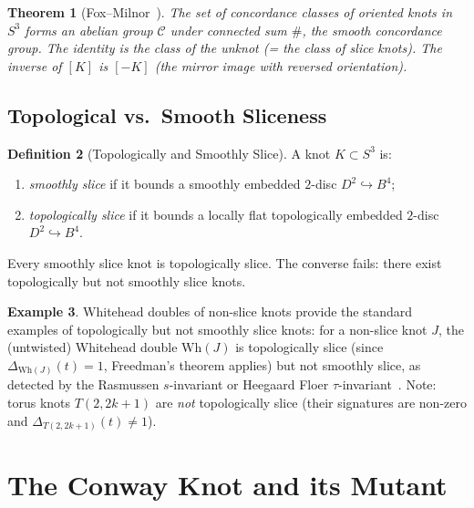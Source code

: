 \documentclass[12pt,a4paper]{amsart}
\newtheorem{theorem}{Theorem}[section]
\theoremstyle{definition}
\newtheorem{definition}[theorem]{Definition}
\newtheorem{example}[theorem]{Example}
\theoremstyle{remark}
\begin{document}
\begin{theorem}[Fox--Milnor~\cite{FoxMilnor1966}]
The set of concordance classes of oriented knots in $S^3$ forms an
abelian group $\mathcal{C}$ under connected sum $\#$, the
\emph{smooth concordance group}. The identity is the class of the unknot
(= the class of slice knots). The inverse of $[K]$ is $[-K]$
(the mirror image with reversed orientation).
\end{theorem}

\subsection{Topological vs.\ Smooth Sliceness}

\begin{definition}[Topologically and Smoothly Slice]
A knot $K \subset S^3$ is:
\begin{enumerate}[label=\roman*)]
\item \emph{smoothly slice} if it bounds a smoothly embedded $2$-disc
      $D^2 \hookrightarrow B^4$;
\item \emph{topologically slice} if it bounds a locally flat topologically
      embedded $2$-disc $D^2 \hookrightarrow B^4$.
\end{enumerate}
Every smoothly slice knot is topologically slice. The converse fails:
there exist topologically but not smoothly slice knots.
\end{definition}

\begin{example}
Whitehead doubles of non-slice knots provide the standard examples of
topologically but not smoothly slice knots: for a non-slice knot $J$,
the (untwisted) Whitehead double $\mathrm{Wh}(J)$ is topologically slice
(since $\Delta_{\mathrm{Wh}(J)}(t) = 1$, Freedman's theorem applies) but
not smoothly slice, as detected by the Rasmussen $s$-invariant or
Heegaard Floer $\tau$-invariant~\cite{Hedden2007}.
Note: torus knots $T(2, 2k+1)$ are \emph{not} topologically slice
(their signatures are non-zero and $\Delta_{T(2,2k+1)}(t) \neq 1$).
\end{example}

\section{The Conway Knot and its Mutant}
\end{document}

